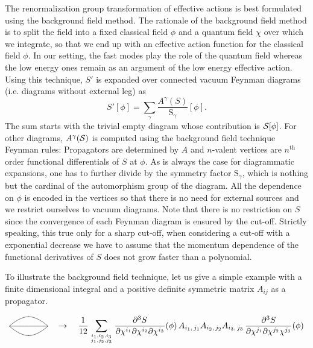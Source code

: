 \documentclass[12pt,here,feynmf]{article}
\begin{document}
The renormalization group transformation of  effective actions is best formulated using the background field method. The rationale of the background field method is to split the field into a fixed classical field $\phi$ and a quantum field $\chi$ over which we integrate, so that we end up with an effective action function for the classical field $\phi$. In our setting, the fast modes play the role of the quantum field whereas the low energy ones remain as an argument of the low energy effective action. Using this technique, $S'$ is expanded over connected vacuum Feynman diagrams (i.e. diagrams without external leg) as
\begin{equation}
S'[\phi]=\sum_{\gamma}\frac{A^{\gamma}(S)}{\mbox{
S}_{\gamma}}[\phi].
\end{equation}
The sum starts with the trivial empty diagram whose contribution is $\cal{S}[ \phi]$. For other diagrams, $A^{\gamma}(\cal S)$ is computed using the background field
technique Feynman rules: Propagators are determined by $A$ and $n$-valent vertices are $n^{\mathrm{th}}$ order functional differentials of $S$ at $\phi$.
As is always the case for diagrammatic expansions, one has to further divide by the symmetry factor $\mathrm{S}_{\gamma}$, which is nothing but the cardinal of the automorphism group of the diagram. All the dependence on $\phi$ is encoded in the vertices so that there is no need for external sources and we restrict ourselves to vacuum diagrams. Note that there is no restriction on $S$  since the convergence of each Feynman diagram is ensured by the cut-off.  Strictly speaking, this true only for a sharp cut-off, when considering a cut-off with a exponential decrease we have to assume that the momentum dependence of the functional derivatives of $S$ does not grow faster than a polynomial.


To illustrate the background field technique, let us give a simple example with a finite dimensional integral and a positive definite symmetric matrix $A_{ij}$ as a propagator.

\[
\xy
(0,0)*{}="A"; 
(16,0)*{}="B"; 
"A"; "B" **\crv{(0,0)&(8,8)&(16,0)};
"A"; "B" **\crv{(0,0)&(16,0)};
"A"; "B" **\crv{(0,0)&(8,-8)&(16,0)};
\endxy
\quad\rightarrow\quad
\frac{1}{12}
\sum_{i_{1},i_{2},i_{3}\atop
j_{1},j_{2},j_{3}}
\frac{\partial^{3}S}{\partial\chi^{i_{1}}\partial\chi^{i_{2}}\partial\chi^{i_{3}}}(\phi)\,
A_{i_{1},\,j_{1}}A_{i_{2},\,j_{2}}A_{i_{3},\,j_{3}}\,
\frac{\partial^{3}S}{\partial \chi^{j_{1}}\partial\chi^{j_{2}}\chi^{j_{3}}}(\phi)
\] 
 
 
 
\end{document}
